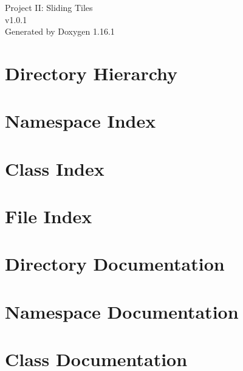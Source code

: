 \documentclass[twoside]{book}
\newcommand{\+}{\discretionary{\mbox{\scriptsize$\hookleftarrow$}}{}{}}
\newcommand{\clearemptydoublepage}{%
    \newpage{\pagestyle{empty}\cleardoublepage}%
  }
\begin{document}
  \raggedbottom
    \hypersetup{pageanchor=false,
                bookmarksnumbered=true,
                pdfencoding=unicode
               }
  \begin{titlepage}
  \vspace*{7cm}
  \begin{center}%
  {\Large Project II:\+ Sliding Tiles}\\
  [1ex]\large v1.\+0.\+1 \\
  \vspace*{1cm}
  {\large Generated by Doxygen 1.16.1}\\
  \end{center}
  \end{titlepage}
  \clearemptydoublepage
  \tableofcontents
  \clearemptydoublepage
  \hypersetup{pageanchor=true}
\chapter{Directory Hierarchy}

\chapter{Namespace Index}

\chapter{Class Index}

\chapter{File Index}

\chapter{Directory Documentation}

\chapter{Namespace Documentation}






\chapter{Class Documentation}

\end{document}
